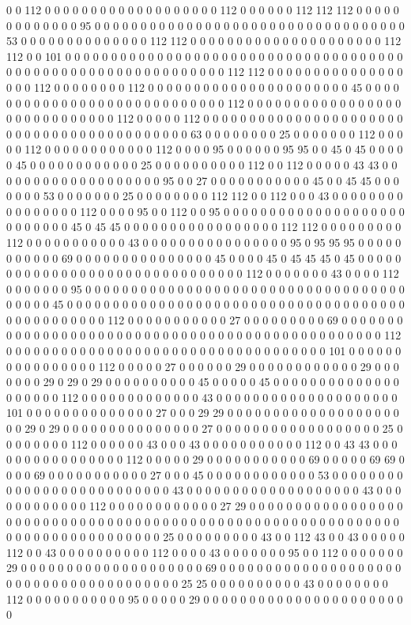 0 0 112 0 0 0 0 0 0 0 0 0 0 0 0 0 0 0 0 0 0 0 112 0 0 0 0 0 0 112 112 112 0 0 0 0 0 0 0 0 0 0 0 0 0 95 0 0 0 0 0 0 0 0 0 0 0 0 0 0 0 0 0 0 0 0 0 0 0 0 0 0 0 0 0 0 0 0 0 0 53 0 0 0 0 0 0 0 0 0 0 0 0 0 0 112 112 0 0 0 0 0 0 0 0 0 0 0 0 0 0 0 0 0 0 0 0 0 112 112 0 0 101 0 0 0 0 0 0 0 0 0 0 0 0 0 0 0 0 0 0 0 0 0 0 0 0 0 0 0 0 0 0 0 0 0 0 0 0 0 0 0 0 0 0 0 0 0 0 0 0 0 0 0 0 0 0 0 0 0 0 0 0 0 112 112 0 0 0 0 0 0 0 0 0 0 0 0 0 0 0 0 0 0 112 0 0 0 0 0 0 0 0 112 0 0 0 0 0 0 0 0 0 0 0 0 0 0 0 0 0 0 0 0 0 0 45 0 0 0 0 0 0 0 0 0 0 0 0 0 0 0 0 0 0 0 0 0 0 0 0 0 0 0 0 112 0 0 0 0 0 0 0 0 0 0 0 0 0 0 0 0 0 0 0 0 0 0 0 0 0 0 0 0 0 112 0 0 0 0 0 112 0 0 0 0 0 0 0 0 0 0 0 0 0 0 0 0 0 0 0 0 0 0 0 0 0 0 0 0 0 0 0 0 0 0 0 0 0 0 0 0 0 0 63 0 0 0 0 0 0 0 0 25 0 0 0 0 0 0 0 112 0 0 0 0 0 112 0 0 0 0 0 0 0 0 0 0 0 0 112 0 0 0 0 95 0 0 0 0 0 0 95 95 0 0 45 0 45 0 0 0 0 0 45 0 0 0 0 0 0 0 0 0 0 0 0 25 0 0 0 0 0 0 0 0 0 0 112 0 0 112 0 0 0 0 0 43 43 0 0 0 0 0 0 0 0 0 0 0 0 0 0 0 0 0 0 0 95 0 0 27 0 0 0 0 0 0 0 0 0 0 0 45 0 0 45 45 0 0 0 0 0 0 0 53 0 0 0 0 0 0 0 25 0 0 0 0 0 0 0 0 112 112 0 0 112 0 0 0 43 0 0 0 0 0 0 0 0 0 0 0 0 0 0 0 0 112 0 0 0 0 95 0 0 112 0 0 95 0 0 0 0 0 0 0 0 0 0 0 0 0 0 0 0 0 0 0 0 0 0 0 0 0 0 0 45 0 45 45 0 0 0 0 0 0 0 0 0 0 0 0 0 0 0 0 0 112 112 0 0 0 0 0 0 0 0 0 112 0 0 0 0 0 0 0 0 0 0 0 43 0 0 0 0 0 0 0 0 0 0 0 0 0 0 0 0 95 0 95 95 95 0 0 0 0 0 0 0 0 0 0 0 69 0 0 0 0 0 0 0 0 0 0 0 0 0 0 0 45 0 0 0 0 45 0 45 45 45 0 45 0 0 0 0 0 0 0 0 0 0 0 0 0 0 0 0 0 0 0 0 0 0 0 0 0 0 0 0 0 0 0 112 0 0 0 0 0 0 0 43 0 0 0 0 112 0 0 0 0 0 0 0 95 0 0 0 0 0 0 0 0 0 0 0 0 0 0 0 0 0 0 0 0 0 0 0 0 0 0 0 0 0 0 0 0 0 0 0 0 0 0 0 0 45 0 0 0 0 0 0 0 0 0 0 0 0 0 0 0 0 0 0 0 0 0 0 0 0 0 0 0 0 0 0 0 0 0 0 0 0 0 0 0 0 0 0 0 0 0 0 0 0 112 0 0 0 0 0 0 0 0 0 0 0 27 0 0 0 0 0 0 0 0 0 69 0 0 0 0 0 0 0 0 0 0 0 0 0 0 0 0 0 0 0 0 0 0 0 0 0 0 0 0 0 0 0 0 0 0 0 0 0 0 0 0 0 0 0 0 0 0 0 0 112 0 0 0 0 0 0 0 0 0 0 0 0 0 0 0 0 0 0 0 0 0 0 0 0 0 0 0 0 0 0 0 0 0 0 0 101 0 0 0 0 0 0 0 0 0 0 0 0 0 0 0 0 112 0 0 0 0 0 27 0 0 0 0 0 0 29 0 0 0 0 0 0 0 0 0 0 0 0 29 0 0 0 0 0 0 0 29 0 29 0 29 0 0 0 0 0 0 0 0 0 0 45 0 0 0 0 0 45 0 0 0 0 0 0 0 0 0 0 0 0 0 0 0 0 0 0 0 0 112 0 0 0 0 0 0 0 0 0 0 0 0 0 43 0 0 0 0 0 0 0 0 0 0 0 0 0 0 0 0 0 0 0 0 101 0 0 0 0 0 0 0 0 0 0 0 0 0 0 27 0 0 0 29 29 0 0 0 0 0 0 0 0 0 0 0 0 0 0 0 0 0 0 0 0 0 29 0 29 0 0 0 0 0 0 0 0 0 0 0 0 0 0 0 27 0 0 0 0 0 0 0 0 0 0 0 0 0 0 0 0 0 0 25 0 0 0 0 0 0 0 0 112 0 0 0 0 0 0 43 0 0 0 43 0 0 0 0 0 0 0 0 0 0 0 112 0 0 43 43 0 0 0 0 0 0 0 0 0 0 0 0 0 0 0 0 112 0 0 0 0 0 29 0 0 0 0 0 0 0 0 0 0 0 69 0 0 0 0 0 69 69 0 0 0 0 69 0 0 0 0 0 0 0 0 0 0 0 27 0 0 0 45 0 0 0 0 0 0 0 0 0 0 0 0 53 0 0 0 0 0 0 0 0 0 0 0 0 0 0 0 0 0 0 0 0 0 0 0 0 0 0 43 0 0 0 0 0 0 0 0 0 0 0 0 0 0 0 0 0 0 0 43 0 0 0 0 0 0 0 0 0 0 0 0 112 0 0 0 0 0 0 0 0 0 0 0 0 27 29 0 0 0 0 0 0 0 0 0 0 0 0 0 0 0 0 0 0 0 0 0 0 0 0 0 0 0 0 0 0 0 0 0 0 0 0 0 0 0 0 0 0 0 0 0 0 0 0 0 0 0 0 0 0 0 0 0 0 0 0 0 0 0 0 0 0 0 0 0 0 0 0 0 0 0 0 0 25 0 0 0 0 0 0 0 0 0 43 0 0 112 43 0 0 43 0 0 0 0 0 112 0 0 43 0 0 0 0 0 0 0 0 0 0 112 0 0 0 0 43 0 0 0 0 0 0 0 95 0 0 112 0 0 0 0 0 0 0 29 0 0 0 0 0 0 0 0 0 0 0 0 0 0 0 0 0 0 0 0 69 0 0 0 0 0 0 0 0 0 0 0 0 0 0 0 0 0 0 0 0 0 0 0 0 0 0 0 0 0 0 0 0 0 0 0 0 0 0 0 25 25 0 0 0 0 0 0 0 0 0 0 43 0 0 0 0 0 0 0 0 112 0 0 0 0 0 0 0 0 0 0 0 95 0 0 0 0 0 29 0 0 0 0 0 0 0 0 0 0 0 0 0 0 0 0 0 0 0 0 0 0 0 